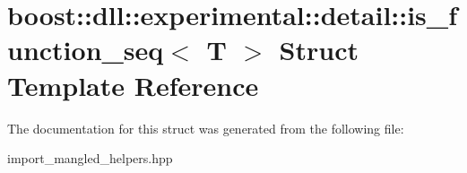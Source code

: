 \hypertarget{a00169}{}\section{boost\+:\+:dll\+:\+:experimental\+:\+:detail\+:\+:is\+\_\+function\+\_\+seq$<$ T $>$ Struct Template Reference}
\label{a00169}


The documentation for this struct was generated from the following file\+:\begin{DoxyCompactItemize}
\item 
import\+\_\+mangled\+\_\+helpers.\+hpp\end{DoxyCompactItemize}
